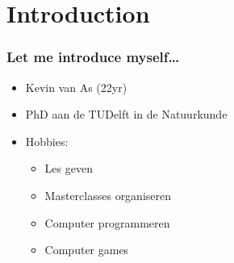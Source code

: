 \section{Introduction}


\begin{frame}
\frametitle{Let me introduce myself\ldots}

\begin{itemize}
  \item Kevin van As (22yr)
  \pause
  \item PhD aan de TUDelft in de Natuurkunde
  \pause
  \item Hobbies:
  \begin{itemize}
  	\item Les geven
  	\item Masterclasses organiseren
  	\pause
  	\item Computer programmeren
  	\pause
  	\item Computer games
  \end{itemize}
\end{itemize}
\end{frame}

